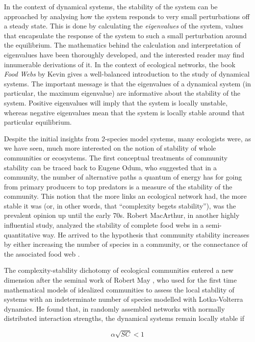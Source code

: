 In the context of dynamical systems, the stability of the system can be approached by analysing how the system responds to very small perturbations off a steady state. This is done by calculating the \textit{eigenvalues} of the system, values that encapsulate the response of the system to such a small perturbation around the equilibrium. The mathematics behind the calculation and interpretation of eigenvalues have been thoroughly developed, and the interested reader may find innumerable derivations of it. In the context of ecological networks, the book \textit{Food Webs} by Kevin \cite{McCann2011} gives a well-balanced introduction to the study of dynamical systems. The important message is that the eigenvalues of a dynamical system (in particular, the maximum eigenvalue) are informative about the stability of the system. Positive eigenvalues will imply that the system is locally unstable, whereas negative eigenvalues mean that the system is locally stable around that particular equilibrium.

Despite the initial insights from 2-species model systems, many ecologists were, as we have seen, much more interested on the notion of stability of whole communities or ecosystems. The first conceptual treatments of community stability can be traced back to Eugene Odum, who suggested that in a community, the number of alternative paths a quantum of energy has for going from primary producers to top predators is a measure of the stability of the community. This notion that the more links an ecological network had, the more stable it was (or, in other words, that ``complexity begets stability''), was the prevalent opinion up until the early 70s. Robert MacArthur, in another highly influential study, analyzed the stability of complete food webs in a semi-quantitative way. He arrived to the hypothesis that community stability increases by either increasing the number of species in a community, or the connectance of the associated food web \citep{MacArthur1955}.

The complexity-stability dichotomy of ecological communities entered a new dimension after the seminal work of Robert May \citep{May1972}, who used for the first time mathematical models of idealized communities to assess the local stability of systems with an indeterminate number of species modelled with Lotka-Volterra dynamics. He found that, in randomly assembled networks with normally distributed interaction strengths, the dynamical systems remain locally stable if

\begin{equation}
\alpha \sqrt{SC} < 1\label{eq:May}
\end{equation}

